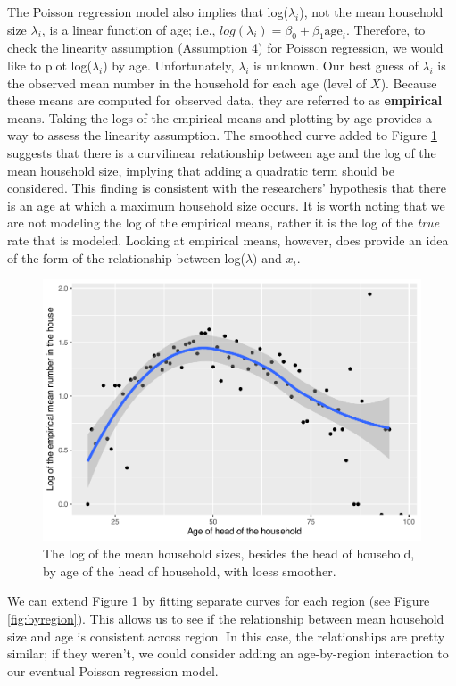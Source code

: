 \documentclass[
]{krantz}
\begin{document}
The Poisson regression model also implies that log(\(\lambda_i\)), not the mean household size \(\lambda_i\), is a linear function of age; i.e., \(log(\lambda_i)=\beta_0+\beta_1\textrm{age}_i\). Therefore, to check the linearity assumption (Assumption 4) for Poisson regression, we would like to plot log(\(\lambda_i\)) by age. Unfortunately, \(\lambda_i\) is unknown. Our best guess of \(\lambda_i\) is the observed mean number in the household for each age (level of \(X\)). Because these means are computed for observed data, they are referred to as \textbf{empirical} means. Taking the logs of the empirical means and plotting by age provides a way to assess the linearity assumption. The smoothed curve added to Figure \ref{fig:ageXnhouse} suggests that there is a curvilinear relationship between age and the log of the mean household size, implying that adding a quadratic term should be considered. This finding is consistent with the researchers' hypothesis that there is an age at which a maximum household size occurs. It is worth noting that we are not modeling the log of the empirical means, rather it is the log of the \emph{true} rate that is modeled. Looking at empirical means, however, does provide an idea of the form of the relationship between log(\(\lambda)\) and \(x_i\).

\begin{figure}

{\centering \includegraphics[width=0.6\linewidth]{bookdown-BeyondMLR_files/figure-latex/ageXnhouse-1} 

}

\caption{The log of the mean household sizes, besides the head of household, by age of the head of household, with loess smoother.}\label{fig:ageXnhouse}
\end{figure}

We can extend Figure \ref{fig:ageXnhouse} by fitting separate curves for each region (see Figure \ref{fig:byregion}). This allows us to see if the relationship between mean household size and age is consistent across region. In this case, the relationships are pretty similar; if they weren't, we could consider adding an age-by-region interaction to our eventual Poisson regression model.
\end{document}
